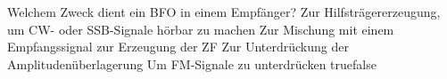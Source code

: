     {Welchem Zweck dient ein BFO in einem Empfänger?}
    {Zur Hilfsträgererzeugung, um CW- oder SSB-Signale hörbar zu machen}
    {Zur Mischung mit einem Empfangssignal zur Erzeugung der ZF}
    {Zur Unterdrückung der Amplitudenüberlagerung}
    {Um FM-Signale zu unterdrücken}
    {true}{false}